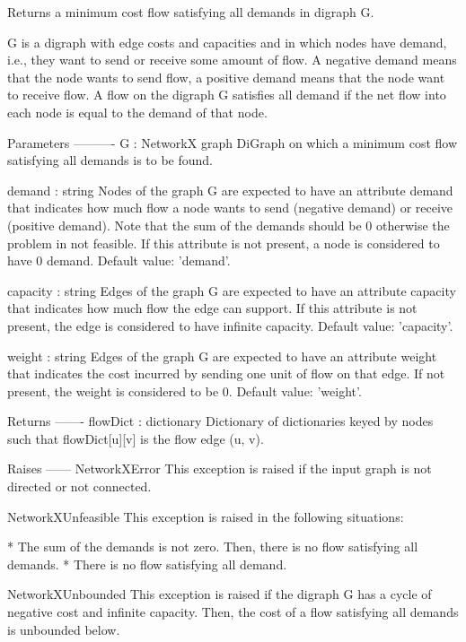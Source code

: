 \begin{DoxyVerb}Returns a minimum cost flow satisfying all demands in digraph G.

G is a digraph with edge costs and capacities and in which nodes
have demand, i.e., they want to send or receive some amount of
flow. A negative demand means that the node wants to send flow, a
positive demand means that the node want to receive flow. A flow on
the digraph G satisfies all demand if the net flow into each node
is equal to the demand of that node.

Parameters
----------
G : NetworkX graph
    DiGraph on which a minimum cost flow satisfying all demands is
    to be found.

demand : string
    Nodes of the graph G are expected to have an attribute demand
    that indicates how much flow a node wants to send (negative
    demand) or receive (positive demand). Note that the sum of the
    demands should be 0 otherwise the problem in not feasible. If
    this attribute is not present, a node is considered to have 0
    demand. Default value: 'demand'.

capacity : string
    Edges of the graph G are expected to have an attribute capacity
    that indicates how much flow the edge can support. If this
    attribute is not present, the edge is considered to have
    infinite capacity. Default value: 'capacity'.

weight : string
    Edges of the graph G are expected to have an attribute weight
    that indicates the cost incurred by sending one unit of flow on
    that edge. If not present, the weight is considered to be 0.
    Default value: 'weight'.

Returns
-------
flowDict : dictionary
    Dictionary of dictionaries keyed by nodes such that
    flowDict[u][v] is the flow edge (u, v).

Raises
------
NetworkXError
    This exception is raised if the input graph is not directed or
    not connected.

NetworkXUnfeasible
    This exception is raised in the following situations:

        * The sum of the demands is not zero. Then, there is no
          flow satisfying all demands.
        * There is no flow satisfying all demand.

NetworkXUnbounded
    This exception is raised if the digraph G has a cycle of
    negative cost and infinite capacity. Then, the cost of a flow
    satisfying all demands is unbounded below.


\end{DoxyVerb}
